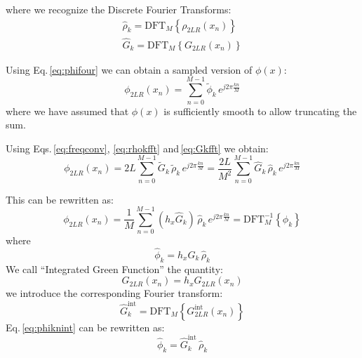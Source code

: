 where we recognize the Discrete Fourier Transforms:
\begin{align}
\hat{\rho}_k = \text{DFT}_M\left\{ \rho_{2LR}(x_n)\right\}\\
\hat{G}_k = \text{DFT}_M\left\{ G_{2LR}(x_n)\right\}
\end{align}



Using Eq.\,\eqref{eq:phifour} we can obtain a sampled version of $\phi(x)$:
\begin{equation}
\phi_{2LR}(x_n) = 
\sum_{n=0}^{M-1}  
\tilde{\phi}_k\, e^{j2\pi \frac{kn}{M}}
\label{eq:phifft}
\end{equation}
where we have assumed that $\phi(x)$ is sufficiently smooth to allow truncating the sum.


Using Eqs.\,\eqref{eq:freqconv}, \eqref{eq:rhokfft} and\,\eqref{eq:Gkfft}  we obtain:
\begin{equation}
\phi_{2LR}(x_n) = 
2L \sum_{n=0}^{M-1}  
\tilde{G}_k \, \tilde{\rho}_k\, e^{j2\pi \frac{kn}{M}} 
= 
\frac{2L}{M^2}
\sum_{n=0}^{M-1}  
\hat{G}_k \, \hat{\rho}_k\, e^{j2\pi \frac{kn}{M}} 
\label{eq:phifftsimpl}
\end{equation}

This can be rewritten as:
\begin{equation}
\phi_{2LR}(x_n) = 
\frac{1}{M}
\sum_{n=0}^{M-1}  
(h_x\hat{G}_k) \, \hat{\rho}_k\, e^{j2\pi \frac{kn}{M}} 
=\text{DFT}_M^{-1}\left\{\phi_k
\right\}
\label{eq:invfft}
\end{equation}
where 
\begin{equation}
\hat{\phi}_k =h_x\hat{G}_k \, \hat{\rho}_k
\label{eq:phiknint}
\end{equation}
We call ``Integrated Green Function'' the quantity:
\begin{equation}
G_{2LR}(x_n) = h_x G_{2LR}(x_n)
\end{equation}
we introduce the corresponding Fourier transform:
\begin{equation}
\hat{G}_k^\text{int} = \text{DFT}_M\left\{ G_{2LR}^\text{int}(x_n)\right\}
\end{equation}
Eq.\,\eqref{eq:phiknint} can be rewritten as:
\begin{equation}
\boxed{
\hat{\phi}_k =\hat{G}_k^\text{int} \, \hat{\rho}_k}
\end{equation}

